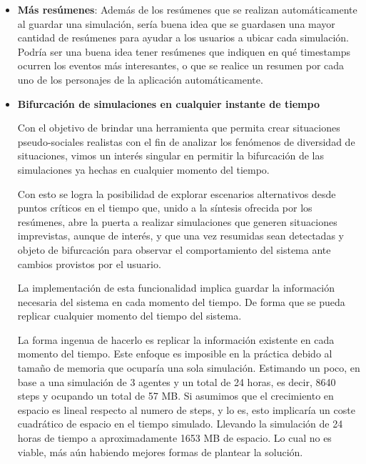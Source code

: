 \begin{itemize}
	\item \textbf{Más resúmenes}: Además de los resúmenes que se realizan automáticamente al guardar una simulación, sería buena idea que se guardasen una mayor cantidad de resúmenes para ayudar a los usuarios a ubicar cada simulación. Podría ser una buena idea tener resúmenes que indiquen en qué timestamps ocurren los eventos más interesantes, o que se realice un resumen por cada uno de los personajes de la aplicación automáticamente.

	\item\textbf{Bifurcación de simulaciones en cualquier instante de tiempo}

Con el objetivo de brindar una herramienta que permita crear situaciones pseudo-sociales realistas con el fin de analizar los fenómenos de diversidad de situaciones, vimos un interés singular en permitir la bifurcación de las simulaciones ya hechas en cualquier momento del tiempo.

Con esto se logra la posibilidad de explorar escenarios alternativos desde puntos críticos en el tiempo que, unido a la síntesis ofrecida por los resúmenes, abre la puerta a realizar simulaciones que generen situaciones imprevistas, aunque de interés, y que una vez resumidas sean detectadas y objeto de bifurcación para observar el comportamiento del sistema ante cambios provistos por el usuario.

La implementación de esta funcionalidad implica guardar la información necesaria del sistema en cada momento del tiempo. De forma que se pueda replicar cualquier momento del tiempo del sistema. 

La forma ingenua de hacerlo es replicar la información existente en cada momento del tiempo. Este enfoque es imposible en la práctica debido al tamaño de memoria que ocuparía una sola simulación. Estimando un poco, en base a una simulación de 3 agentes y un total de 24 horas, es decir, 8640 steps y ocupando un total de 57 MB. Si asumimos que el crecimiento en espacio es lineal respecto al numero de steps, y lo es, esto implicaría un coste cuadrático de espacio en el tiempo simulado. Llevando la simulación de 24 horas de tiempo a aproximadamente 1653 MB de espacio. Lo cual no es viable, más aún habiendo mejores formas de plantear la solución.	

\end{itemize}

